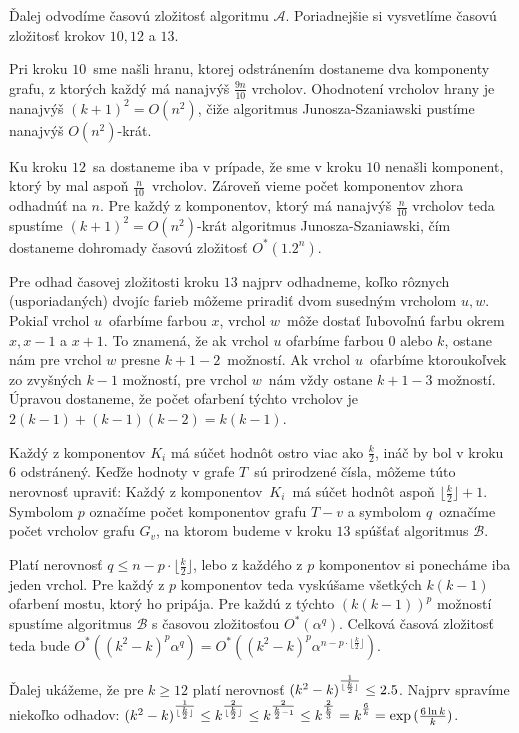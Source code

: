 Ďalej odvodíme časovú zložitosť algoritmu $\mathcal{A}$. Poriadnejšie si vysvetlíme časovú zložitosť
krokov $10, 12$ a $13$.

Pri kroku $10$ sme našli hranu, ktorej odstránením dostaneme dva komponenty
grafu, z ktorých každý má nanajvýš $\frac{9n}{10}$ vrcholov. Ohodnotení vrcholov hrany je nanajvýš
$(k+1)^2 = O(n^2)$, čiže algoritmus Junosza-Szaniawski pustíme nanajvýš $O(n^2)$-krát.

Ku kroku $12$ sa dostaneme iba v prípade, že sme v kroku $10$ nenašli komponent, ktorý by mal
aspoň $\frac{n}{10}$ vrcholov. Zároveň vieme počet komponentov zhora odhadnúť na $n$. Pre každý
z komponentov, ktorý má nanajvýš $\frac{n}{10}$ vrcholov teda spustíme $(k+1)^2 = O(n^2)$-krát
algoritmus Junosza-Szaniawski, čím dostaneme dohromady časovú zložitosť $O^*(1.2^n)$.

Pre odhad časovej zložitosti kroku $13$ najprv odhadneme, koľko rôznych (usporiadaných) dvojíc
farieb môžeme priradiť dvom susedným vrcholom $u, w$. 
Pokiaľ vrchol $u$ ofarbíme farbou $x$, vrchol $w$ môže dostať ľubovoľnú farbu okrem $x, x-1$ a $x + 1$.
To znamená, že ak vrchol $u$ ofarbíme farbou $0$ alebo $k$, ostane nám pre vrchol $w$ presne $k + 1 - 2$ možností.
Ak vrchol $u$ ofarbíme ktoroukoľvek zo zvyšných $k-1$ možností, pre vrchol $w$ nám vždy ostane $k + 1 - 3$
možností. Úpravou dostaneme, že počet ofarbení týchto vrcholov je $2(k-1) + (k-1)(k-2) = k(k-1)$.

Každý z komponentov $K_i$ má súčet hodnôt ostro viac ako $\frac{k}{2}$, ináč by bol v kroku $6$
odstránený. Keďže hodnoty v grafe $T$ sú prirodzené čísla, môžeme túto nerovnosť upraviť:
Každý z komponentov $K_i$ má súčet hodnôt aspoň $\lfloor \frac{k}{2} \rfloor + 1$. Symbolom $p$
označíme počet komponentov grafu $T - v$ a symbolom $q$ označíme počet vrcholov grafu $G_v$,
na ktorom budeme v kroku $13$ spúšťať algoritmus $\mathcal{B}$.

Platí nerovnosť $q \leq n - p \cdot \lfloor \frac{k}{2} \rfloor$, lebo z každého z $p$ komponentov
si ponecháme iba jeden vrchol. Pre každý z $p$ komponentov teda vyskúšame všetkých $k(k-1)$ ofarbení
mostu, ktorý ho pripája. Pre každú z týchto $(k(k-1))^p$ možností spustíme algoritmus $\mathcal{B}$
s časovou zložitosťou $O^*(\alpha^q)$. Celková časová zložitosť teda bude $O^*\left((k^2-k)^p \alpha^q\right) =
O^*\left((k^2 - k)^p \alpha^{n - p \cdot \lfloor \frac{k}{2} \rfloor}\right)$.

Ďalej ukážeme, že pre $k \ge 12$ platí nerovnosť $(k^2 - k)\strut^{\frac{1}{\lfloor \frac{k}{2} \rfloor}} \leq 2.5$.
Najprv spravíme niekoľko odhadov: $(k^2 - k)\strut^{\frac{1}{\lfloor \frac{k}{2} \rfloor}} \leq k\strut^{\frac{2}{\lfloor \frac{k}{2} \rfloor}} \leq
k\strut^{\frac{2}{\frac{k}{2} - 1}} \leq k\strut^{\frac{2}{\frac{k}{3}}} = k\strut^{\frac{6}{k}} = \exp{(\frac{6 \ln{k}}{k})}$.

